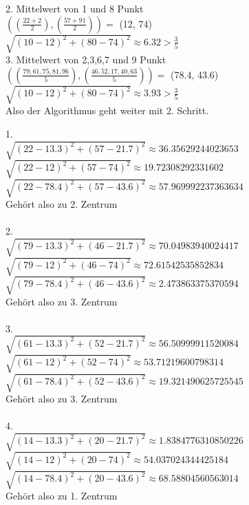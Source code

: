 \begin{enumerate}
2. Mittelwert von 1 und 8 Punkt \\
$((\frac{22+2}{2}), (\frac{57+91}{2})) =$ (12, 74) \\
$\sqrt{(10-12)^2 + (80-74)^2} \approx 6.32 > \frac{3}{5}$ \\

3. Mittelwert von 2,3,6,7 und 9 Punkt \\
$((\frac{79,61,75,81,96}{5}), (\frac{46,52,17,40,63}{5})) =$ (78.4, 43.6) \\
$\sqrt{(10-12)^2 + (80-74)^2} \approx 3.93 > \frac{3}{5}$ \\

Also der Algorithmus geht weiter mit 2. Schritt.

1. \\ 
$\sqrt{(22-13.3)^2 + (57-21.7)^2} \approx 36.35629244023653$ \\ 
$\sqrt{(22-12)^2 + (57-74)^2} \approx 19.72308292331602$ \\ 
$\sqrt{(22-78.4)^2 + (57-43.6)^2} \approx 57.969992237363634$ \\ 
Gehört also zu 2. Zentrum \\ \\

2. \\ 
$\sqrt{(79-13.3)^2 + (46-21.7)^2} \approx 70.04983940024417$ \\ 
$\sqrt{(79-12)^2 + (46-74)^2} \approx 72.61542535852834$ \\ 
$\sqrt{(79-78.4)^2 + (46-43.6)^2} \approx 2.473863375370594$ \\ 
Gehört also zu 3. Zentrum \\ \\

3. \\ 
$\sqrt{(61-13.3)^2 + (52-21.7)^2} \approx 56.50999911520084$ \\ 
$\sqrt{(61-12)^2 + (52-74)^2} \approx 53.71219600798314$ \\ 
$\sqrt{(61-78.4)^2 + (52-43.6)^2} \approx 19.321490625725545$ \\ 
Gehört also zu 3. Zentrum \\ \\

4. \\ 
$\sqrt{(14-13.3)^2 + (20-21.7)^2} \approx 1.8384776310850226$ \\ 
$\sqrt{(14-12)^2 + (20-74)^2} \approx 54.037024344425184$ \\ 
$\sqrt{(14-78.4)^2 + (20-43.6)^2} \approx 68.58804560563014$ \\ 
Gehört also zu 1. Zentrum \\ \\


\end{enumerate}
